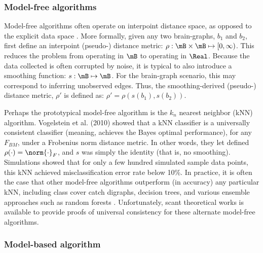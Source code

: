 \subsubsection{Model-free algorithms}

Model-free algorithms often operate on interpoint distance space, as opposed to the explicit data space \cite{MaaBartoszynski96}.  More formally, given any two brain-graphs, $b_1$ and $b_2$, first define an interpoint (pseudo-) distance metric: $\rho: \mB \times \mB \mapsto [0,\infty)$.  This reduces the problem from operating in $\mB$ to operating in $\Real$.  Because the data collected is often corrupted by noise, it is typical to also introduce a smoothing function: $s: \mB \mapsto \mB$.  For the brain-graph scenario, this may correspond to inferring unobserved edges.  Thus, the smoothing-derived (pseudo-) distance metric, $\rho'$ is defined as: $\rho' = \rho(s(b_1),s(b_2))$.  

Perhaps the prototypical model-free algorithm is the $k_n$ nearest neighbor (kNN) algorithm.  Vogelstein et al. (2010) showed that a kNN classifier is a universally consistent classifier (meaning, achieves the Bayes optimal performance), for any $F_{BM}$, under a Frobenius norm distance metric. In other words, they let defined $\rho(\cdot)=\norm{\cdot}_F$, and $s$ was simply the identity (that is, no smoothing).  Simulations showed that for only a few hundred simulated sample data points, this kNN achieved misclassification error rate below 10\%.  In practice, it is often the case that other model-free algorithms outperform (in accuracy) any particular kNN, including class cover catch digraphs, decision trees, and various ensemble approaches such as random forests \cite{}.  Unfortunately, scant theoretical works is available to provide proofs of universal consistency for these alternate model-free algorithms.



\subsubsection{Model-based algorithm}

